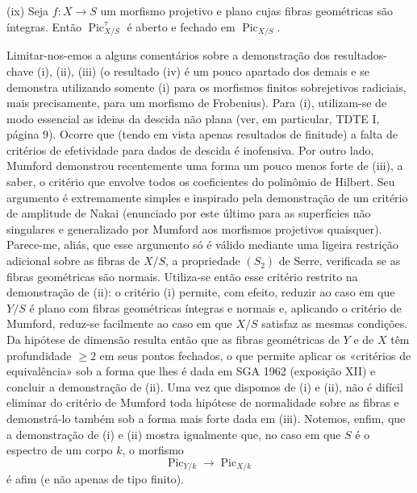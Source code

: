 \medskip
\noindent(ix) Seja $f:X\longrightarrow S$ um morfismo projetivo e plano cujas
fibras geométricas são íntegras. Então $\operatorname{Pic}_{X/S}^\tau$ é aberto
e fechado em $\operatorname{Pic}_{X/S}$.

Limitar-nos-emos a alguns comentários sobre a demonstração dos resultados-chave
(i), (ii), (iii) (o resultado (iv) é um pouco apartado dos demais e se demonstra
utilizando somente (i) para os morfismos finitos sobrejetivos radiciais, mais
precisamente, para um morfismo de Frobenius). Para (i), utilizam-se de modo
essencial as ideias da descida não plana (ver, em particular, TDTE I, página 9).
Ocorre que (tendo em vista apenas resultados de finitude) a falta de critérios
de efetividade para dados de descida é inofensiva. Por outro lado, Mumford
demonstrou recentemente uma forma um pouco menos forte de (iii), a saber, o
critério que envolve todos os coeficientes do polinômio de Hilbert. Seu
argumento é extremamente simples e inspirado pela demonstração de um critério
de amplitude de Nakai (enunciado por este último para as superfícies não
singulares e generalizado por Mumford aos morfismos projetivos quaisquer).
Parece-me, aliás, que esse argumento só é válido mediante uma ligeira restrição
adicional sobre as fibras de $X/S$, a propriedade $(S_2)$ de Serre, verificada
se as fibras geométricas são normais. Utiliza-se então esse critério restrito na
demonstração de (ii): o critério (i) permite, com efeito, reduzir ao caso em que
$Y/S$ é plano com fibras geométricas íntegras e normais e, aplicando o critério
de Mumford, reduz-se facilmente ao caso em que $X/S$ satisfaz as mesmas
condições. Da hipótese de dimensão resulta então que as fibras geométricas de
$Y$ e de $X$ têm profundidade $\geq2$ em seus pontos fechados, o que permite
aplicar os «critérios de equivalência» sob a forma que lhes é dada em SGA 1962
(exposição XII) e concluir a demonstração de (ii). Uma vez que dispomos de (i) e
(ii), não é difícil eliminar do critério de Mumford toda hipótese de normalidade
sobre as fibras e demonstrá-lo também sob a forma mais forte dada em (iii).
Notemos, enfim, que a demonstração de (i) e (ii) mostra igualmente que, no
caso em que $S$ é o espectro de um corpo $k$, o morfismo
\[
\operatorname{Pic}_{Y/k}\longrightarrow\operatorname{Pic}_{X/k}
\]
é afim (e não apenas de tipo finito).

\par
